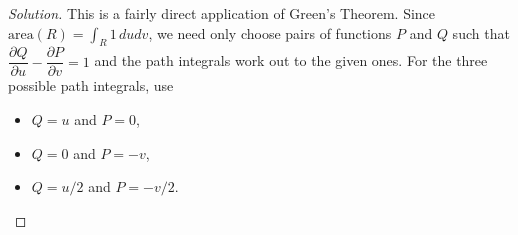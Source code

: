 \documentclass[Shifrin_Solutions_Spring_2015]{subfiles}
\begin{document}
\begin{proof}[Solution]
This is a fairly direct application of Green's Theorem. Since $\text{area}(R) = \int_R 1\, dudv$, we need only choose pairs of functions $P$ and $Q$ such that
$\dfrac{\partial Q}{\partial u} - \dfrac{\partial P}{\partial v} = 1$ and the path integrals work out to the given ones.
For the three possible path integrals, use
\begin{itemize}

\item $Q = u$ and $P = 0$,

\item $Q=0$ and $P = -v$,

\item $Q = u/2$ and $P = -v/2$.
\end{itemize}


\end{proof}
\end{document}
